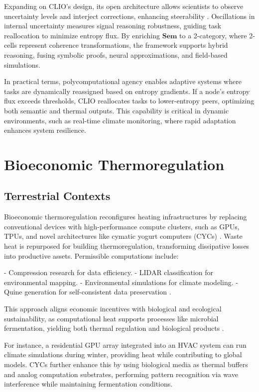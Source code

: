 \documentclass[12pt]{article}
\begin{document}
Expanding on CLIO’s design, its open architecture allows scientists to observe uncertainty levels and interject corrections, enhancing steerability \citep{ChengBroadbentChappell2025}. Oscillations in internal uncertainty measures signal reasoning robustness, guiding task reallocation to minimize entropy flux. By enriching $ \mathbf{Sem} $ to a 2-category, where 2-cells represent coherence transformations, the framework supports hybrid reasoning, fusing symbolic proofs, neural approximations, and field-based simulations.

In practical terms, polycomputational agency enables adaptive systems where tasks are dynamically reassigned based on entropy gradients. If a node’s entropy flux exceeds thresholds, CLIO reallocates tasks to lower-entropy peers, optimizing both semantic and thermal outputs. This capability is critical in dynamic environments, such as real-time climate monitoring, where rapid adaptation enhances system resilience.

\section{Bioeconomic Thermoregulation}
\label{sec:bioeconomic-thermoregulation}

\subsection{Terrestrial Contexts}

Bioeconomic thermoregulation reconfigures heating infrastructures by replacing conventional devices with high-performance compute clusters, such as GPUs, TPUs, and novel architectures like cymatic yogurt computers (CYCs) \citep{Bennett1982, SagawaUeda2009}. Waste heat is repurposed for building thermoregulation, transforming dissipative losses into productive assets. Permissible computations include:

- Compression research for data efficiency.
- LIDAR classification for environmental mapping.
- Environmental simulations for climate modeling.
- Quine generation for self-consistent data preservation \citep{Wolfram2002}.

This approach aligns economic incentives with biological and ecological sustainability, as computational heat supports processes like microbial fermentation, yielding both thermal regulation and biological products \citep{CapraLuisi2014, MargulisSagan1995}.

For instance, a residential GPU array integrated into an HVAC system can run climate simulations during winter, providing heat while contributing to global models. CYCs further enhance this by using biological media as thermal buffers and analog computation substrates, performing pattern recognition via wave interference while maintaining fermentation conditions.
\end{document}
